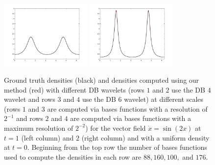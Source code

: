 \documentclass[a4paper, 12 pt]{amsart}
\newcommand{\R}{\mathbb{R}}
\begin{document}
\begin{figure}[p]
  \includegraphics[width=0.4\textwidth]{./images/S1Wavelet_sf6nBases176scale2T1.pdf}
  \includegraphics[width=0.4\textwidth]{./images/S1Wavelet_sf6nBases176scale2T2.pdf}
  \caption{Ground truth densities (black) and densities computed using our method (red) with different DB wavelets (rows $1$ and $2$ use the DB $4$ wavelet and rows $3$ and $4$ use the DB $6$ wavelet) at different scales (rows $1$ and $3$ are computed via bases functions with a resolution of $2^{-1}$ and rows $2$ and $4$ are computed via bases functions with a maximum resolution of $2^{-2}$) for the vector field $\dot{x}=\sin(2x)$ at $t=1$ (left column) and $2$ (right column) and with a uniform density at $t=0$. Beginning from the top row the number of bases functions used to compute the densities in each row are $88,160,100,$ and $176$.}
  \label{fig:one_dim_system_wavelet}
\end{figure}
\pagebreak
\end{document}
